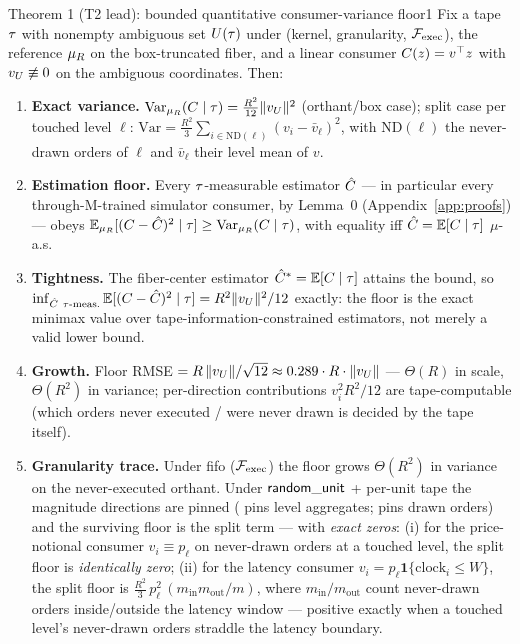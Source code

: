 \begin{preregthm}{Theorem 1 (T2 lead): bounded quantitative consumer-variance floor}{1}
\label{thm:t2-floor}
Fix a tape $\tau$ with nonempty ambiguous set $U(\tau)$ under
(kernel, granularity, $\mathcal{F}_{\mathrm{exec}}$), the reference $\mu_{R}$ on the box-truncated
fiber, and a linear consumer $C(z) = v^{\top}z$ with
$v_{U} \not\equiv 0$ on the ambiguous coordinates. Then:
\begin{enumerate}
\item[(a)] \textbf{Exact variance.}
$\mathrm{Var}_{\mu_{R}}(C \mid \tau) = \tfrac{R^2}{12}\|v_{U}\|^2$
(orthant/box case); split case per touched level $\ell$:
$\mathrm{Var} = \tfrac{R^2}{3}\sum_{i \in \mathrm{ND}(\ell)}
(v_i - \bar{v}_\ell)^2$, with $\mathrm{ND}(\ell)$ the never-drawn orders of
$\ell$ and $\bar{v}_\ell$ their level mean of $v$.
\item[(b)] \textbf{Estimation floor.} Every $\tau$-measurable estimator
$\hat{C}$ --- in particular every through-M-trained simulator consumer,
by Lemma~0 (Appendix~\ref{app:proofs}) --- obeys
$\mathbb{E}_{\mu_{R}}[(C - \hat{C})^2 \mid \tau] \ge
\mathrm{Var}_{\mu_{R}}(C \mid \tau)$, with equality iff
$\hat{C} = \mathbb{E}[C \mid \tau]$ $\mu$-a.s.
\item[(c)] \textbf{Tightness.} The fiber-center estimator
$\hat{C}^{*} = \mathbb{E}[C \mid \tau]$ attains the bound, so
$\inf_{\hat{C}\ \tau\text{-meas.}}
\mathbb{E}[(C-\hat{C})^2 \mid \tau]
= R^2\|v_{U}\|^2/12$ exactly: the floor is the exact minimax value over
tape-information-constrained estimators, not merely a valid lower bound.
\item[(d)] \textbf{Growth.} Floor RMSE $= R\,\lVert v_{U}\rVert/\sqrt{12} \approx
0.289 \cdot R \cdot \|v_{U}\|$ --- $\Theta(R)$ in scale, $\Theta(R^2)$ in
variance; per-direction contributions $v_i^2 R^2/12$ are tape-computable
(which orders never executed / were never drawn is decided by the tape
itself).
\item[(e)] \textbf{Granularity trace.} Under fifo ($\mathcal{F}_{\mathrm{exec}}$) the floor grows
$\Theta(R^2)$ in variance on the never-executed orthant. Under
$\mathsf{random\_unit}$ + per-unit tape the magnitude directions are pinned
( pins level aggregates;  pins
drawn orders) and the surviving floor is the split term --- with
\emph{exact zeros}: (i) for the price-notional consumer
$v_i \equiv p_\ell$ on never-drawn orders at a touched level, the split floor
is \emph{identically zero}; (ii) for the latency consumer
$v_i = p_\ell \mathbf{1}\{\mathrm{clock}_i \le W\}$, the split floor is
$\tfrac{R^2}{3}\, p_\ell^2\, (m_{\mathrm{in}} m_{\mathrm{out}} / m)$, where
$m_{\mathrm{in}}/m_{\mathrm{out}}$ count never-drawn orders inside/outside
the latency window --- positive exactly when a touched level's never-drawn
orders straddle the latency boundary.
\end{enumerate}
\end{preregthm}

